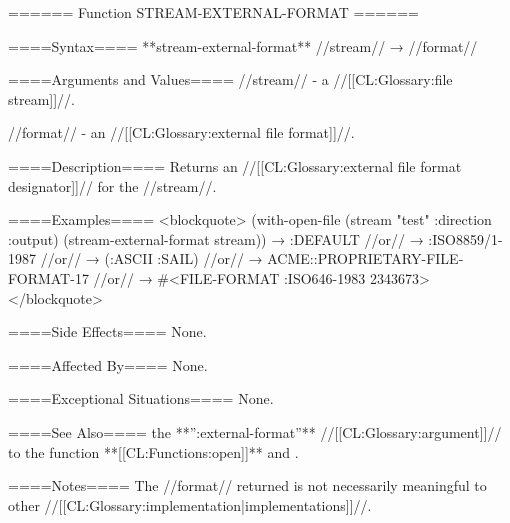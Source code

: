 ====== Function STREAM-EXTERNAL-FORMAT ======

====Syntax====
**stream-external-format** //stream// → //format//

====Arguments and Values====
//stream// - a //[[CL:Glossary:file stream]]//.

//format// - an //[[CL:Glossary:external file format]]//.

====Description====
Returns an //[[CL:Glossary:external file format designator]]// for the //stream//.

====Examples====
<blockquote> (with-open-file (stream "test" :direction :output) (stream-external-format stream)) → :DEFAULT //or// → :ISO8859/1-1987 //or// → (:ASCII :SAIL) //or// → ACME::PROPRIETARY-FILE-FORMAT-17 //or// → #<FILE-FORMAT :ISO646-1983 2343673> </blockquote>

====Side Effects====
None.

====Affected By====
None.

====Exceptional Situations====
None.

====See Also====
the **'':external-format''** //[[CL:Glossary:argument]]// to the function **[[CL:Functions:open]]** and .

====Notes====
The //format// returned is not necessarily meaningful to other //[[CL:Glossary:implementation|implementations]]//.

